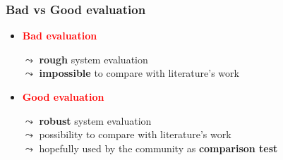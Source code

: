 \begin{frame}
	\frametitle{Bad vs Good evaluation}
	
	\begin{itemize}
		\item \textcolor{red}{\textbf{Bad evaluation}}
		\vspace{-0.1cm}
		
		\begin{tabbing}
			\normalsize
			\hspace*{0.4cm}
			$ \leadsto $ \textbf{rough} system evaluation\\
			
			\normalsize
			\hspace*{0.4cm}
			$ \leadsto $ \textbf{impossible} to compare with literature's work
		\end{tabbing}
		
		\item \textcolor{red}{\textbf{Good evaluation}}
		\vspace{-0.1cm}
		
		\begin{tabbing}
			\normalsize
			\hspace*{0.4cm}
			$ \leadsto $ \textbf{robust} system evaluation\\
			
			\normalsize
			\hspace*{0.4cm}
			$ \leadsto $ possibility to compare with literature's work\\
			
			\normalsize
			\hspace*{0.4cm}
			$ \leadsto $ hopefully used by the community as \textbf{comparison test}
		\end{tabbing}
	\end{itemize}
\end{frame}
